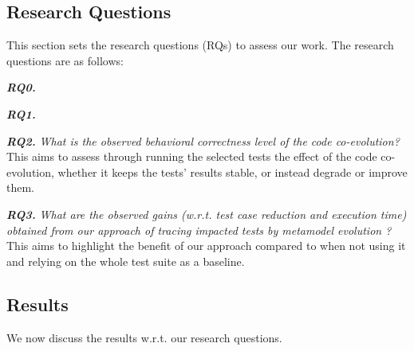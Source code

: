 \subsection{Research Questions}
This section sets the research questions (RQs) to assess our work. The research questions are as follows:


\textbf{\emph{RQ0.}}  

\textbf{\emph{RQ1.}}   %

\textbf{\emph{RQ2.}} \emph{What is the observed behavioral correctness level of the code co-evolution?} This aims to assess through running the selected tests the effect of the code co-evolution, whether it keeps the tests' results stable, or instead degrade or improve them. %


\textbf{\emph{RQ3.}} \emph{What are the observed gains (w.r.t. test case reduction and execution time) obtained from our approach of tracing impacted tests by metamodel evolution ?} This aims to highlight the benefit of our approach compared to when not using it and relying on the whole test suite as a baseline. 


\subsection{Results}
We now discuss the results w.r.t. our research questions.

